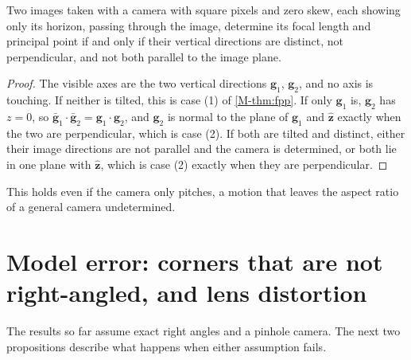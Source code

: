 \begin{remark}\label{cor:twohorizons}
Two images taken with a camera with square pixels and zero skew, each showing only its horizon, passing through the image, determine its focal length and principal point if and only if their vertical directions are distinct, not perpendicular, and not both parallel to the image plane.
\end{remark}
\begin{proof}
The visible axes are the two vertical directions $\mathbf g_1$, $\mathbf g_2$, and no axis is touching. If neither is tilted, this is case (1) of \cref{M-thm:fpp}. If only $\mathbf g_1$ is, $\mathbf g_2$ has $z=0$, so $\bar{\mathbf g}_1\cdot\bar{\mathbf g}_2=\mathbf g_1\cdot\mathbf g_2$, and $\mathbf g_2$ is normal to the plane of $\mathbf g_1$ and $\hat{\mathbf z}$ exactly when the two are perpendicular, which is case (2). If both are tilted and distinct, either their image directions are not parallel and the camera is determined, or both lie in one plane with $\hat{\mathbf z}$, which is case (2) exactly when they are perpendicular.
\end{proof}

This holds even if the camera only pitches, a motion that leaves the aspect ratio of a general camera undetermined.

\section{Model error: corners that are not right-angled, and lens distortion}\label{sec:robust}

The results so far assume exact right angles and a pinhole camera. The next two propositions describe what happens when either assumption fails.

